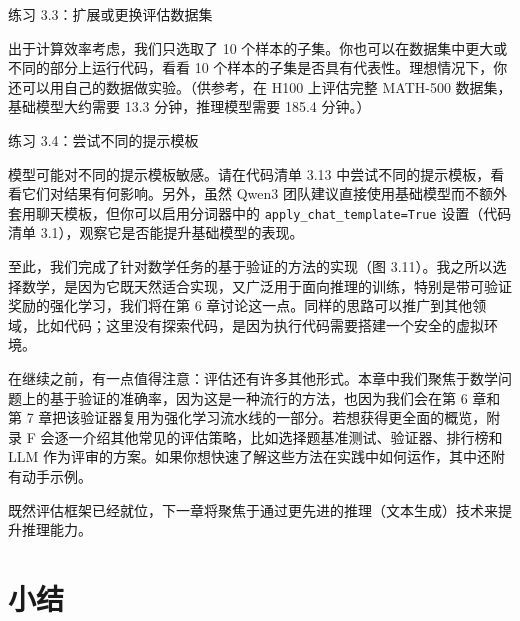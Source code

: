\begin{mySidebar}{练习 3.3：扩展或更换评估数据集}

出于计算效率考虑，我们只选取了 10 个样本的子集。你也可以在数据集中更大或不同的部分上运行代码，看看 10 个样本的子集是否具有代表性。理想情况下，你还可以用自己的数据做实验。（供参考，在 H100 上评估完整 MATH-500 数据集，基础模型大约需要 13.3 分钟，推理模型需要 185.4 分钟。）

\end{mySidebar}

\begin{mySidebar}{练习 3.4：尝试不同的提示模板}

模型可能对不同的提示模板敏感。请在代码清单 3.13 中尝试不同的提示模板，看看它们对结果有何影响。另外，虽然 Qwen3 团队建议直接使用基础模型而不额外套用聊天模板，但你可以启用分词器中的 \texttt{apply\_chat\_template=True} 设置（代码清单 3.1），观察它是否能提升基础模型的表现。

\end{mySidebar}

至此，我们完成了针对数学任务的基于验证的方法的实现（图 3.11）。我之所以选择数学，是因为它既天然适合实现，又广泛用于面向推理的训练，特别是带可验证奖励的强化学习，我们将在第 6 章讨论这一点。同样的思路可以推广到其他领域，比如代码；这里没有探索代码，是因为执行代码需要搭建一个安全的虚拟环境。


在继续之前，有一点值得注意：评估还有许多其他形式。本章中我们聚焦于数学问题上的基于验证的准确率，因为这是一种流行的方法，也因为我们会在第 6 章和第 7 章把该验证器复用为强化学习流水线的一部分。若想获得更全面的概览，附录 F 会逐一介绍其他常见的评估策略，比如选择题基准测试、验证器、排行榜和 LLM 作为评审的方案。如果你想快速了解这些方法在实践中如何运作，其中还附有动手示例。

既然评估框架已经就位，下一章将聚焦于通过更先进的推理（文本生成）技术来提升推理能力。

\section{小结}

